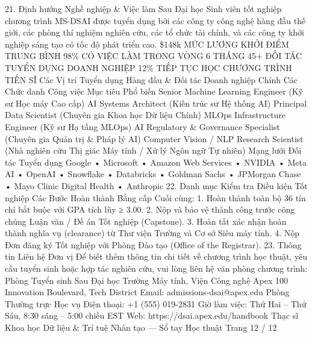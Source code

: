 21. Định hướng Nghề nghiệp \& Việc làm Sau Đại học
Sinh viên tốt nghiệp chương trình MS-DSAI được tuyển dụng bởi các công ty công nghệ hàng đầu thế giới, các phòng thí nghiệm nghiên cứu, các tổ chức tài chính, và các công ty khởi nghiệp sáng tạo có tốc độ phát triển cao.
\$148k
MỨC LƯƠNG KHỞI ĐIỂM TRUNG BÌNH
98\%
CÓ VIỆC LÀM TRONG VÒNG 6 THÁNG
45+
ĐỐI TÁC TUYỂN DỤNG DOANH NGHIỆP
12\%
TIẾP TỤC HỌC CHƯƠNG TRÌNH TIẾN SĨ
Các Vị trí Tuyển dụng Hàng đầu \& Đối tác Doanh nghiệp Chính
Các Chức danh Công việc Mục tiêu Phổ biến
Senior Machine Learning Engineer (Kỹ sư Học máy Cao cấp)
AI Systems Architect (Kiến trúc sư Hệ thống AI)
Principal Data Scientist (Chuyên gia Khoa học Dữ liệu Chính)
MLOps Infrastructure Engineer (Kỹ sư Hạ tầng MLOps)
AI Regulatory \& Governance Specialist (Chuyên gia Quản trị \& Pháp lý AI)
Computer Vision / NLP Research Scientist (Nhà nghiên cứu Thị giác Máy tính / Xử lý Ngôn ngữ Tự nhiên)
Mạng lưới Đối tác Tuyển dụng
Google • Microsoft • Amazon Web Services • NVIDIA • Meta AI
• OpenAI • Snowflake • Databricks • Goldman Sachs •
JPMorgan Chase • Mayo Clinic Digital Health • Anthropic
22. Danh mục Kiểm tra Điều kiện Tốt nghiệp
Các Bước Hoàn thành Bằng cấp Cuối cùng:
1. Hoàn thành toàn bộ 36 tín chỉ bắt buộc với GPA tích lũy ≥ 3.00.
2. Nộp và bảo vệ thành công trước công chúng Luận văn / Đề án Tốt nghiệp (Capstone).
3. Hoàn tất xác nhận hoàn thành nghĩa vụ (clearance) từ Thư viện Trường và Cơ sở Siêu máy tính.
4. Nộp Đơn đăng ký Tốt nghiệp với Phòng Đào tạo (Office of the Registrar).
23. Thông tin Liên hệ Đơn vị
Để biết thêm thông tin chi tiết về chương trình học thuật, yêu cầu tuyển sinh hoặc hợp tác nghiên cứu, vui lòng liên hệ văn phòng chương trình:
Phòng Tuyển sinh Sau Đại học
Trường Máy tính, Viện Công nghệ Apex
100 Innovation Boulevard, Tech District
Email: admissions-dsai@apex.edu
Phòng Thường trực Học vụ
Điện thoại: +1 (555) 019-2831
Giờ làm việc: Thứ Hai – Thứ Sáu, 8:30 sáng – 5:00 chiều EST
Web: https://dsai.apex.edu/handbook
Thạc sĩ Khoa học Dữ liệu \& Trí tuệ Nhân tạo — Sổ tay Học thuật
Trang 12 / 12
